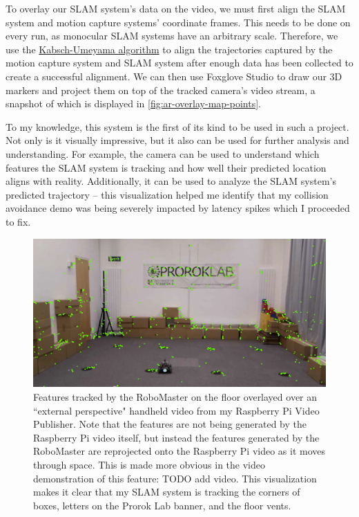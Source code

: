 To overlay our SLAM system's data on the video, we must first align the SLAM system and motion capture systems' coordinate frames. This needs to be done on every run, as monocular SLAM systems have an arbitrary scale. Therefore, we use the \hyperref[sec:kabsch-umeyama-algorithm]{Kabsch-Umeyama algorithm} to align the trajectories captured by the motion capture system and SLAM system after enough data has been collected to create a successful alignment. We can then use Foxglove Studio to draw our 3D markers and project them on top of the tracked camera's video stream, a snapshot of which is displayed in \autoref{fig:ar-overlay-map-points}.

To my knowledge, this system is the first of its kind to be used in such a project. Not only is it visually impressive, but it also can be used for further analysis and understanding. For example, the camera can be used to understand which features the SLAM system is tracking and how well their predicted location aligns with reality. Additionally, it can be used to analyze the SLAM system's predicted trajectory – this visualization helped me identify that my collision avoidance demo was being severely impacted by latency spikes which I proceeded to fix.

\begin{figure}[h]
    \centering
    \includegraphics[width=\linewidth]{figures/ar_overlay_map_points.png}

    \caption{Features tracked by the RoboMaster on the floor overlayed over an ``external perspective" handheld video from my Raspberry Pi Video Publisher. Note that the features are not being generated by the Raspberry Pi video itself, but instead the features generated by the RoboMaster are reprojected onto the Raspberry Pi video as it moves through space. This is made more obvious in the video demonstration of this feature: TODO add video. \captionbreak This visualization makes it clear that my SLAM system is tracking the corners of boxes, letters on the Prorok Lab banner, and the floor vents.}
    \label{fig:ar-overlay-map-points}
\end{figure}


